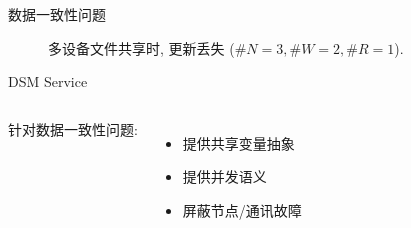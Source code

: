 \begin{frame}{数据一致性问题}
  \begin{figure}[h!]
    \centering
    \begin{adjustbox}{max totalsize = {0.70\textwidth}{0.65\textheight}, center}
      
    \end{adjustbox}
    \caption{多设备文件共享时, 更新丢失 ($\#N = 3, \#W = 2, \#R = 1$).}
  \end{figure}
\end{frame}
\begin{frame}{DSM Service}
  \begin{columns}

      针对数据一致性问题:
      \begin{itemize}
	\item 提供共享变量抽象
	\item 提供并发语义
	\item 屏蔽节点/通讯故障
      \end{itemize}
  \end{columns}
\end{frame}
